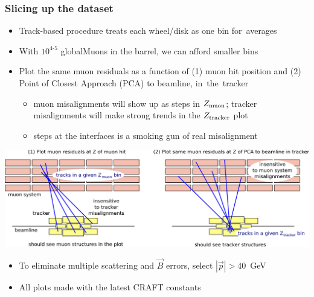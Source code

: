 \documentclass[compress]{beamer}
\begin{document}
\begin{frame}
\frametitle{Slicing up the dataset}
\begin{itemize}\setlength{\itemsep}{0.1 cm}
\item Track-based procedure treats each wheel/disk as one bin \mbox{for averages\hspace{-1 cm}}
\item With $10^{4\mbox{-}5}$ globalMuons in the barrel, we can afford smaller bins
\item Plot the same muon residuals as a function of (1) muon hit position
  and (2) Point of Closest Approach (PCA) to beamline, \mbox{in the tracker\hspace{-1 cm}}
\begin{itemize}
\item muon misalignments will show up as steps in $Z_{\mbox{\scriptsize muon}}$;
  tracker misalignments will make strong trends in the $Z_{\mbox{\scriptsize tracker}}$ plot
\item steps at the interfaces is a smoking gun of real misalignment
\end{itemize}
\end{itemize}

\vfill
\includegraphics[width=\linewidth]{track_selection.png}

\begin{itemize}
\item To eliminate multiple scattering and $\vec{B}$ errors, select $|\vec{p}| > 40$~GeV
\item All plots made with the latest CRAFT constants
\end{itemize}
\end{frame}
\end{document}
